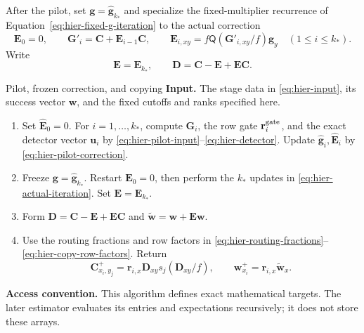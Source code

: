 \documentclass[11pt]{article}
\numberwithin{equation}{section}
\theoremstyle{definition}
\theoremstyle{remark}
\begin{document}
After the pilot, set ${\mathbf{g}}=\widehat {\mathbf{g}}_{k_*}$ and specialize the fixed-multiplier
recurrence of Equation~\eqref{eq:hier-fixed-g-iteration} to the actual correction
\begin{equation}
 {\mathbf{E}}_0=0,\qquad {\mathbf{G}}'_i={\mathbf{C}}+{\mathbf{E}}_{i-1}{\mathbf{C}},\qquad
 {\mathbf{E}}_{i,xy}=f{\mathsf{Q}}({\mathbf{G}}'_{i,xy}/f){\mathbf{g}}_{y}\quad(1\leq i\leq k_*).
 \label{eq:hier-actual-iteration}
\end{equation}
Write
\begin{equation}
 {\mathbf{E}}={\mathbf{E}}_{k_*},\qquad {\mathbf{D}}={\mathbf{C}}-{\mathbf{E}}+{\mathbf{E}}{\mathbf{C}}.
 \label{eq:hier-residual-definition}
\end{equation}

\begin{algorithm}[label=alg:exact-stage]{Pilot, frozen correction, and copying}
\textbf{Input.} The stage data in \eqref{eq:hier-input}, its success vector ${\mathbf{w}}$, and the fixed cutoffs and ranks specified here.
\begin{enumerate}[leftmargin=*]
\item Set $\widehat {\mathbf{E}}_0=0$. For $i=1,\ldots,k_*$, compute ${\mathbf{G}}_i$, the row gate ${\mathbf{r}}^{\rm gate}_i$, and the exact detector vector ${\mathbf{u}}_i$ by \eqref{eq:hier-pilot-input}--\eqref{eq:hier-detector}. Update $\widehat {\mathbf{g}}_i,\widehat {\mathbf{E}}_i$ by \eqref{eq:hier-pilot-correction}.
\item Freeze ${\mathbf{g}}=\widehat {\mathbf{g}}_{k_*}$. Restart ${\mathbf{E}}_0=0$, then perform the $k_*$ updates in \eqref{eq:hier-actual-iteration}. Set ${\mathbf{E}}={\mathbf{E}}_{k_*}$.
\item Form ${\mathbf{D}}={\mathbf{C}}-{\mathbf{E}}+{\mathbf{E}}{\mathbf{C}}$ and $\widetilde {\mathbf{w}}={\mathbf{w}}+{\mathbf{E}}{\mathbf{w}}$.
\item Use the routing fractions and row factors in \eqref{eq:hier-routing-fractions}--\eqref{eq:hier-copy-row-factors}. Return
\[
 {\mathbf{C}}^{+}_{x_i,y_j}={\mathbf{r}}_{i,x}{\mathbf{D}}_{xy}s_j({\mathbf{D}}_{xy}/f),\qquad
 {\mathbf{w}}^{+}_{x_i}={\mathbf{r}}_{i,x}\widetilde {\mathbf{w}}_{x}.
\]
\end{enumerate}
\textbf{Access convention.} This algorithm defines exact mathematical targets. The later estimator evaluates its entries and expectations recursively; it does not store these arrays.
\end{algorithm}
\end{document}
